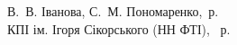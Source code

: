 {\begin{alwayssingle}
		\vfill

	\hfill
	\begin{minipage}[t]{0.5\linewidth}\small
        \textcopyright{} В.~В. Іванова, С.~М. Пономаренко, \the\year\,р. \\
        \textcopyright{}  КПІ ім. Ігоря Сікорського (НН ФТІ), \the\year~р.
    \end{minipage}
		\newpage%
	\end{alwayssingle}
}










